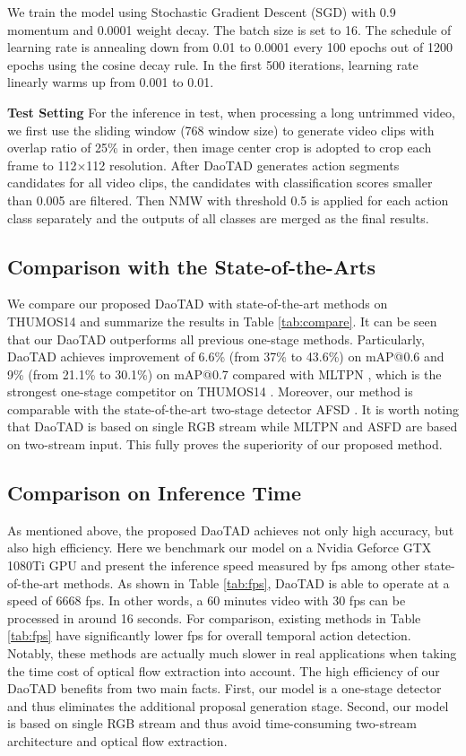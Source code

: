 \documentclass[final]{cvpr}
\begin{document}
We train the model using Stochastic Gradient Descent (SGD) with 0.9 momentum and 0.0001 weight decay. The batch size is set to 16. The schedule of learning rate is annealing down from 0.01 to 0.0001 every 100 epochs out of 1200 epochs using the cosine decay rule. In the first 500 iterations, learning rate linearly warms up from 0.001 to 0.01.

\textbf{Test Setting}
For the inference in test, when processing a long untrimmed video, we first use the sliding window (768 window size) to generate video clips with overlap ratio of 25$\%$ in order, then image center crop is adopted to crop each frame to 112$\times$112 resolution. After DaoTAD generates action segments candidates for all video clips, the candidates with classification scores smaller than 0.005 are filtered. Then NMW \cite{ning2017inception} with threshold 0.5 is applied for each action class separately and the outputs of all classes are merged as the final results.

\subsection{Comparison with the State-of-the-Arts}
We compare our proposed DaoTAD with state-of-the-art methods on THUMOS14 \cite{jiang2014thumos} and summarize the results in Table \ref{tab:compare}. It can be seen that our DaoTAD outperforms all previous one-stage methods. Particularly, DaoTAD achieves improvement of 6.6\% (from 37\% to 43.6\%) on mAP@0.6 and 9\% (from 21.1\% to 30.1\%) on mAP@0.7 compared with MLTPN \cite{wang2020multi}, which is the strongest one-stage competitor on THUMOS14 \cite{jiang2014thumos}. Moreover, our method is comparable with the state-of-the-art two-stage detector AFSD \cite{lin2021learning}. It is worth noting that DaoTAD is based on single RGB stream while MLTPN \cite{wang2020multi} and ASFD \cite{lin2021learning} are based on two-stream input. This fully proves the superiority of our proposed method.

\subsection{Comparison on Inference Time}
As mentioned above, the proposed DaoTAD achieves not only high accuracy, but also high efficiency. Here we benchmark our model on a Nvidia Geforce GTX 1080Ti GPU and present the inference speed measured by fps among other state-of-the-art methods. As shown in Table \ref{tab:fps}, DaoTAD is able to operate at a speed of 6668 fps. In other words, a 60 minutes video with 30 fps can be processed in around 16 seconds. For comparison, existing methods in Table \ref{tab:fps} have significantly lower fps for overall temporal action detection. Notably, these methods are actually much slower in real applications when taking the time cost of optical flow extraction into account. The high efficiency of our DaoTAD benefits from two main facts. First, our model is a one-stage detector and thus eliminates the additional proposal generation stage. Second, our model is based on single RGB stream and thus avoid time-consuming two-stream architecture and optical flow extraction. 
\end{document}
